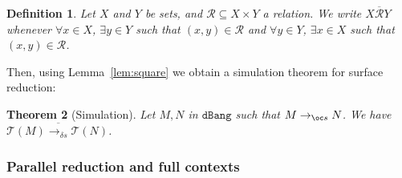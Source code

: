 \documentclass[10pt,a4paper]{article}
\newtheorem{theorem}{Theorem}
\newtheorem{definition}[theorem]{Definition}
\newcommand{\<}{\langle}
\renewcommand{\>}{\rangle}
\newcommand{\dbang}{\ensuremath{\mathtt{dBang}}}
\newcommand{\todbs}{\to_{\oc s}} %
\newcommand{\todbrs}{\to_{\delta s}} %
\newcommand{\extend}[1]{\overline{#1}}
\newcommand{\taylor}[1]{\ensuremath{\mathcal{T}(#1)}}
\newcommand{\nativeemdash}{\ifmmode\text{\textemdash}\else\textemdash\fi}
\begin{document}
\begin{definition} 
	Let $X$ and $Y$ be sets, and $\mathcal R\subseteq X\times Y$ a relation. We write
	$X\extend{\mathcal R} Y$ whenever $\forall x\in X$, $\exists y\in Y$ such that $(x,y)\in \mathcal R$
	and $\forall y\in Y$, $\exists x\in X$ such that $(x,y)\in \mathcal R$.
\end{definition}

Then, using Lemma~\ref{lem:square} we obtain a simulation theorem for
surface reduction:

\begin{theorem}[Simulation]
	\label{thm:simu_taylor_db}
	Let $M,N$ in \dbang{} such that $M\todbs N$. We have $\taylor M
	\extend{\todbrs} \taylor N$.
\end{theorem}


\subsubsection{Parallel reduction and full contexts}
\label{subsec:parallel}
\end{document}

